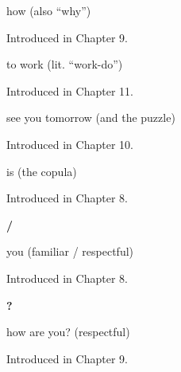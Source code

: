 \noindent\begin{minipage}[t]{\linewidth}
\raggedright
\textbf{}\par
\small how (also \textquotedblleft{}why\textquotedblright{})\par
\footnotesize Introduced in Chapter 9.
\end{minipage}\par\medskip

\noindent\begin{minipage}[t]{\linewidth}
\raggedright
\textbf{ }\par
\small to work (lit. \textquotedblleft{}work-do\textquotedblright{})\par
\footnotesize Introduced in Chapter 11.
\end{minipage}\par\medskip

\noindent\begin{minipage}[t]{\linewidth}
\raggedright
\textbf{ }\par
\small see you tomorrow (and the  puzzle)\par
\footnotesize Introduced in Chapter 10.
\end{minipage}\par\medskip

\noindent\begin{minipage}[t]{\linewidth}
\raggedright
\textbf{}\par
\small is (the copula)\par
\footnotesize Introduced in Chapter 8.
\end{minipage}\par\medskip

\noindent\begin{minipage}[t]{\linewidth}
\raggedright
\textbf{ / }\par
\small you (familiar / respectful)\par
\footnotesize Introduced in Chapter 8.
\end{minipage}\par\medskip

\noindent\begin{minipage}[t]{\linewidth}
\raggedright
\textbf{  ?}\par
\small how are you? (respectful)\par
\footnotesize Introduced in Chapter 9.
\end{minipage}\par\medskip

